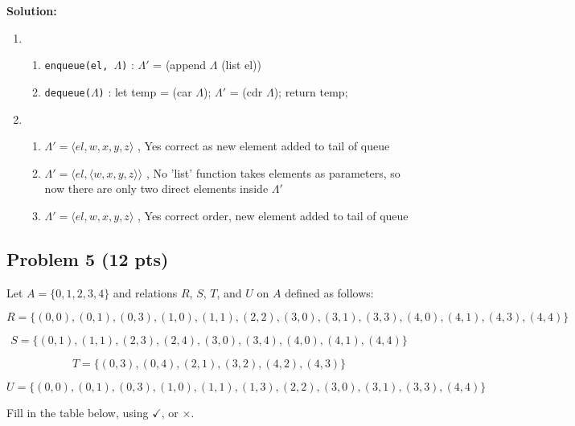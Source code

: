 \documentclass[12pt]{article}
\begin{document}
\bigskip
\noindent \textbf{Solution:}
\begin{enumerate}
\item \begin{enumerate}
\item \texttt{enqueue(el, $\Lambda$)} : $\Lambda'$ = (append $\Lambda$ (list el)) 
\item \texttt{dequeue($\Lambda$)} : let temp = (car $\Lambda$); $\Lambda'$ = (cdr $\Lambda$); return temp;
\end{enumerate}
\item \begin{enumerate}
\item $\Lambda' = \langle el, w, x, y, z \rangle$ , Yes correct as new element added to tail of queue
\item $\Lambda' = \langle el, \langle w, x, y, z \rangle \rangle$ , No 'list' function takes elements as parameters, so now there are only two direct elements inside $\Lambda'$
\item $\Lambda' = \langle el, w, x, y, z \rangle$ , Yes correct order, new element added to tail of queue
\end{enumerate}
\end{enumerate}


\newpage

\subsection{Problem 5 (12 pts)}

\noindent Let $A = \{ 0, 1, 2, 3, 4 \}$ and relations $R$, $S$, $T$, and $U$ on $A$ defined as follows:

\[ R = \{ (0, 0),  (0, 1),  (0, 3),  (1, 0),  (1, 1),  (2, 2),  (3, 0),  (3, 1), (3, 3), (4, 0), (4, 1), (4, 3), (4, 4)  \}\]

\[ S = \{ (0, 1),  (1, 1),  (2, 3),  (2, 4), (3, 0), (3, 4), (4, 0), (4, 1), (4, 4)  \}\]

\[ T = \{ (0, 3), (0, 4),  (2, 1), (3, 2), (4, 2), (4, 3) \}\]

\[ U = \{ (0, 0),  (0, 1), (0, 3), (1, 0), (1, 1), (1, 3), (2, 2), (3, 0), (3, 1), (3, 3), (4, 4) \}\]

\noindent Fill in the table below, using $\checkmark$, or $\times$.
\end{document}
